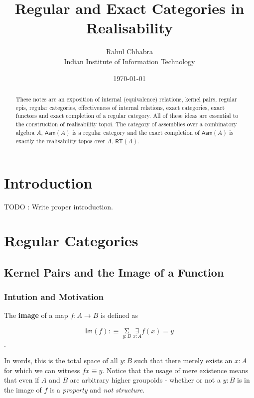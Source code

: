 \documentclass{article}
\newcommand{\cat}[1]{\mathsf{#1}}
\newcommand{\path}{\equiv}
\newcommand{\id}[1]{\mathsf{#1}}
\theoremstyle{plain}
\theoremstyle{remark}
\newcommand\orcidicon[1]{\href{https://orcid.org/#1}{\mbox{\scalerel*{
\begin{tikzpicture}[yscale=-1,transform shape]
\pic{orcidlogo};
\end{tikzpicture}
}{|}}}}
\begin{document}
\title{Regular and Exact Categories in Realisability}
\date{\today}
\author{Rahul Chhabra \orcidicon{0009-0007-7917-6461}\\
{Indian Institute of Information Technology\\}}
\maketitle
\begin{abstract}
    These notes are an exposition of internal (equivalence) relations, kernel pairs, regular epis, regular categories, effectiveness of internal relations, 
    exact categories, exact functors and exact completion of a regular category. All of these ideas are essential to the construction of realisability topoi. The category of assemblies over a 
    combinatory algebra $A$, $\cat{Asm}(A)$ is a regular category and the exact completion of $\cat{Asm}(A)$ is exactly the realisability topos over $A$, $\cat{RT}(A)$.
\end{abstract}

\section{Introduction}

TODO : Write proper introduction.

\section{Regular Categories}

\subsection{Kernel Pairs and the Image of a Function}

\subsubsection{Intution and Motivation}

The \textbf{image} of a map $f : A \to B$ is defined as 

\begin{equation*}
    \id{Im}(f) :\equiv \mathop{\Sigma}\limits_{y : B}^{} \mathop{\exists} \limits_{x : A}^{} f(x) = y 
\end{equation*}. 

In words, this is the total space of all $y : B$ such that there merely exists an $x : A$ for which we can witness $f x \path y$. 
Notice that the usage of mere existence means that even if $A$ and $B$ are arbitrary higher groupoids - whether or not a $y : B$ is in the image of $f$ is a \emph{property} and \emph{not structure}.
\end{document}

